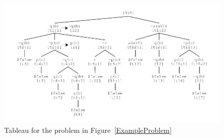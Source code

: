 \documentclass[runningheads]{llncs}
\begin{document}
\begin{figure}[htb]
\centering
\includegraphics[width=1.0\textwidth]{Tableau.pdf}
\vspace*{-1em}
\caption{Tableau for the problem in Figure~\ref{ExampleProblem}}
\label{TableauPicture}
\end{figure}
\end{document}
